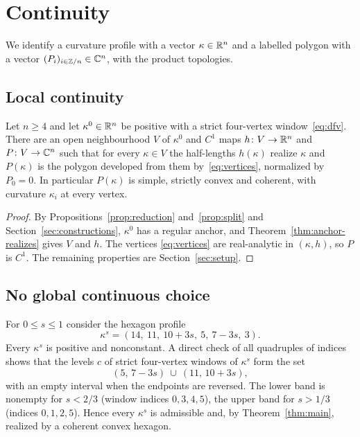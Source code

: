\section{Continuity}\label{sec:continuity}

We identify a curvature profile with a vector $\kappa\in\mathbb{R}^n$ and a labelled
polygon with a vector $(P_i)_{i\in\mathbb{Z}/n}\in\mathbb{C}^n$, with the product topologies.

\subsection{Local continuity}

\begin{theorem}\label{thm:local}
Let $n\ge4$ and let $\kappa^0\in\mathbb{R}^n$ be positive with a strict four-vertex
window~\eqref{eq:dfv}. There are an open neighbourhood $V$ of $\kappa^0$ and
$C^1$ maps $h\colon V\to\mathbb{R}^n$ and $P\colon V\to\mathbb{C}^n$ such that for every
$\kappa\in V$ the half-lengths $h(\kappa)$ realize $\kappa$ and $P(\kappa)$ is
the polygon developed from them by~\eqref{eq:vertices}, normalized by
$P_0=0$. In particular $P(\kappa)$ is simple, strictly convex and coherent,
with curvature $\kappa_i$ at every vertex.
\end{theorem}

\begin{proof}
By Propositions~\ref{prop:reduction} and~\ref{prop:split} and
Section~\ref{sec:constructions}, $\kappa^0$ has a regular anchor, and
Theorem~\ref{thm:anchor-realizes} gives $V$ and $h$. The vertices
\eqref{eq:vertices} are real-analytic in $(\kappa,h)$, so $P$ is $C^1$. The
remaining properties are Section~\ref{sec:setup}.
\end{proof}

\subsection{No global continuous choice}

For $0\le s\le1$ consider the hexagon profile
\begin{equation}\label{eq:band}
  \kappa^{s} = (14,\ 11,\ 10+3s,\ 5,\ 7-3s,\ 3).
\end{equation}
Every $\kappa^s$ is positive and nonconstant. A direct check of all
quadruples of indices shows that the levels $c$ of strict four-vertex windows
of $\kappa^s$ form the set
\[
  (5,\,7-3s)\ \cup\ (11,\,10+3s),
\]
with an empty interval when the endpoints are reversed. The lower band is
nonempty for $s<2/3$ (window indices $0,3,4,5$), the upper band for $s>1/3$
(indices $0,1,2,5$). Hence every $\kappa^s$ is admissible and, by
Theorem~\ref{thm:main}, realized by a coherent convex hexagon.


